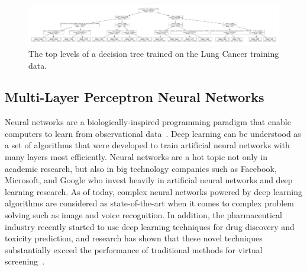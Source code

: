 \documentclass[a4paper,11pt]{article}
\begin{document}
\begin{figure}
\centering 
\begin{center}
\includegraphics[width=.95\textwidth,origin=c]{lungdt.pdf}
\caption{\label{fig:lungdt} The top levels of a decision tree trained on the Lung Cancer training data.}
\end{center}
\end{figure}




\subsection{Multi-Layer Perceptron Neural Networks}


Neural networks are a biologically-inspired programming paradigm that enable computers to learn from observational data~\cite{deeplearning}.
Deep learning can be understood as a set of algorithms that were developed to train artificial neural networks with many layers most efficiently.
 Neural networks are a hot topic not only in academic research, but also in big technology companies such as Facebook, Microsoft, and Google who invest heavily in artificial neural networks and deep learning research. As of today, complex neural networks powered by deep learning algorithms are considered as state-of-the-art when it comes to complex problem solving such as image and voice recognition.
In addition, the pharmaceutical industry recently started to use deep learning techniques for drug discovery and toxicity prediction, and research has shown that these novel techniques substantially exceed the performance of traditional methods for virtual screening~\cite{toxicity}.
\end{document}
